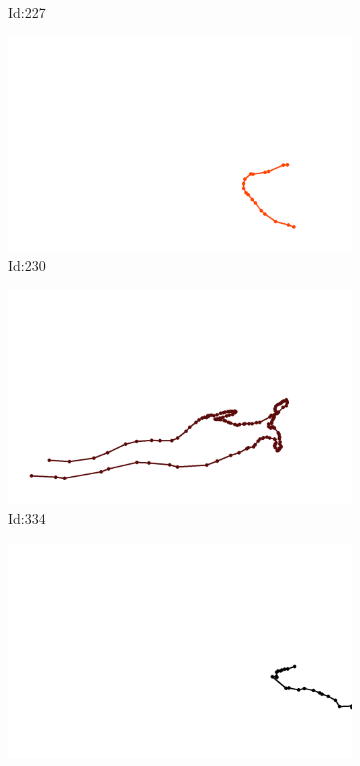 \documentclass[12pt,twoside]{report}
\begin{document}
\begin{figure}
\begin{subfigure}[b]{0.20\textwidth}
\caption{Id:227}
\end{subfigure}
\begin{subfigure}[b]{0.20\textwidth}
\centering
\includegraphics[width=\textwidth]{../trajectories/230.png}
\caption{Id:230}
\end{subfigure}
\begin{subfigure}[b]{0.20\textwidth}
\centering
\includegraphics[width=\textwidth]{../trajectories/334.png}
\caption{Id:334}
\end{subfigure}
\begin{subfigure}[b]{0.20\textwidth}
\centering
\includegraphics[width=\textwidth]{../trajectories/441.png}

\end{subfigure}
\end{figure}
\end{document}
